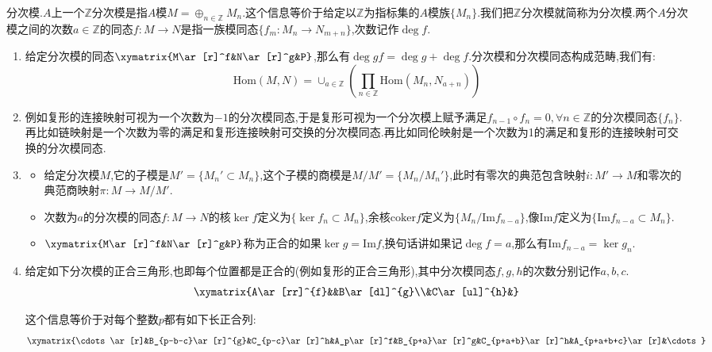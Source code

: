分次模.$A$上一个$\mathbb{Z}$分次模是指$A$模$M=\oplus_{n\in\mathbb{Z}}M_n$.这个信息等价于给定以$\mathbb{Z}$为指标集的$A$模族$\{M_n\}$.我们把$\mathbb{Z}$分次模就简称为分次模.两个$A$分次模之间的次数$a\in\mathbb{Z}$的同态$f:M\to N$是指一族模同态$\{f_m:M_n\to N_{m+n}\}$,次数记作$\deg f$.
\begin{enumerate}
	\item 给定分次模的同态$\xymatrix{M\ar[r]^f&N\ar[r]^g&P}$,那么有$\deg gf=\deg g+\deg f$.分次模和分次模同态构成范畴,我们有:
	$$\mathrm{Hom}(M,N)=\cup_{a\in\mathbb{Z}}\left(\prod_{n\in\mathbb{Z}}\mathrm{Hom}(M_n,N_{a+n})\right)$$
	\item 例如复形的连接映射可视为一个次数为$-1$的分次模同态,于是复形可视为一个分次模上赋予满足$f_{n-1}\circ f_n=0,\forall n\in\mathbb{Z}$的分次模同态$\{f_n\}$.再比如链映射是一个次数为零的满足和复形连接映射可交换的分次模同态.再比如同伦映射是一个次数为1的满足和复形的连接映射可交换的分次模同态.
	\item 
	\begin{itemize}
		\item 给定分次模$M$,它的子模是$M'=\{M_n'\subset M_n\}$,这个子模的商模是$M/M'=\{M_n/M_n'\}$,此时有零次的典范包含映射$i:M'\to M$和零次的典范商映射$\pi:M\to M/M'$.
		\item 次数为$a$的分次模的同态$f:M\to N$的核$\ker f$定义为$\{\ker f_n\subset M_n\}$,余核$\mathrm{coker}f$定义为$\{M_n/\mathrm{Im}f_{n-a}\}$,像$\mathrm{Im}f$定义为$\{\mathrm{Im}f_{n-a}\subset M_n\}$.
		\item $\xymatrix{M\ar[r]^f&N\ar[r]^g&P}$称为正合的如果$\ker g=\mathrm{Im}f$,换句话讲如果记$\deg f=a$,那么有$\mathrm{Im}f_{n-a}=\ker g_n$.
	\end{itemize}
	\item 给定如下分次模的正合三角形,也即每个位置都是正合的(例如复形的正合三角形),其中分次模同态$f,g,h$的次数分别记作$a,b,c$.
	$$\xymatrix{A\ar[rr]^{f}&&B\ar[dl]^{g}\\&C\ar[ul]^{h}&}$$
	
	这个信息等价于对每个整数$p$都有如下长正合列:
	$$\xymatrix{\cdots\ar[r]&B_{p-b-c}\ar[r]^{g}&C_{p-c}\ar[r]^h&A_p\ar[r]^f&B_{p+a}\ar[r]^g&C_{p+a+b}\ar[r]^h&A_{p+a+b+c}\ar[r]&\cdots}$$
\end{enumerate}

